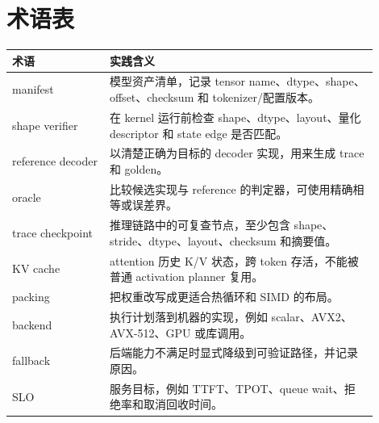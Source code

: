 \chapter*{术语表}
{}

\begin{center}
\small
\begin{tabular}{@{}p{0.24\linewidth}p{0.66\linewidth}@{}}
\toprule
术语 & 实践含义 \\
\midrule
manifest & 模型资产清单，记录 tensor name、dtype、shape、offset、checksum 和 tokenizer/配置版本。 \\
shape verifier & 在 kernel 运行前检查 shape、dtype、layout、量化 descriptor 和 state edge 是否匹配。 \\
reference decoder & 以清楚正确为目标的 decoder 实现，用来生成 trace 和 golden。 \\
oracle & 比较候选实现与 reference 的判定器，可使用精确相等或误差界。 \\
trace checkpoint & 推理链路中的可复查节点，至少包含 shape、stride、dtype、layout、checksum 和摘要值。 \\
KV cache & attention 历史 K/V 状态，跨 token 存活，不能被普通 activation planner 复用。 \\
packing & 把权重改写成更适合热循环和 SIMD 的布局。 \\
backend & 执行计划落到机器的实现，例如 scalar、AVX2、AVX-512、GPU 或库调用。 \\
fallback & 后端能力不满足时显式降级到可验证路径，并记录原因。 \\
SLO & 服务目标，例如 TTFT、TPOT、queue wait、拒绝率和取消回收时间。 \\
\bottomrule
\end{tabular}
\end{center}

